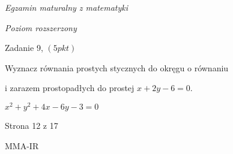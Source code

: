 \documentclass[a4paper,12pt]{article}
\begin{document}
{\it Egzamin maturalny z matematyki}

{\it Poziom rozszerzony}

Zadanie 9, $(5pkt)$

Wyznacz równania prostych stycznych do okręgu o równaniu

i zarazem prostopadłych do prostej $x+2y-6=0.$

$x^{2}+y^{2}+4x-6y-3=0$

Strona 12 z 17

MMA-IR
\end{document}
